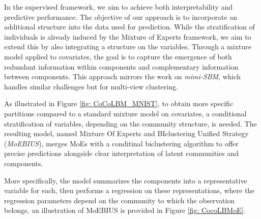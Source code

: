 In the supervised framework, we aim to achieve both interpretability and predictive performance. The objective of our approach is to incorporate an additional structure into the data used for prediction. While the stratification of individuals is already induced by the Mixture of Experts framework, we aim to extend this by also integrating a structure on the variables. Through a mixture model applied to covariates, the goal is to capture the emergence of both redundant information within components and complementary information between components. This approach mirrors the work on \textit{mimi-SBM}, which handles similar challenges but for multi-view clustering.

As illustrated in Figure \ref{fig: CoCoLBM_MNIST}, to obtain more specific partitions compared to a standard mixture model on covariates, a conditional stratification of variables, depending on the community structure, is needed. The resulting model, named Mixture Of Experts and BIclustering Unified Strategy (\textit{MoEBIUS}), merges MoEs with a conditinal biclustering algorithm to offer precise predictions alongside clear interpretation of latent communities and components.

More specifically, the model summarizes the components into a representative variable for each, then performs a regression on these representations, where the regression parameters depend on the community to which the observation belongs, an illustration of MoEBIUS is provided in Figure \ref{fig: CocoLBMoE}.


